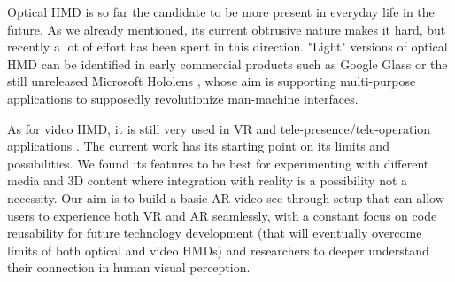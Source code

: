 Optical HMD is so far the candidate to be more present in everyday life in the future. As we already mentioned, its current obtrusive nature makes it hard, but recently a lot of effort has been spent in this direction. "Light" versions of optical HMD can be identified in early commercial products such as Google Glass \cite{google_glass} or the still unreleased Microsoft Hololens \cite{microsoft_hololens}, whose aim is supporting multi-purpose applications to supposedly revolutionize man-machine interfaces.

As for video HMD, it is still very used in VR and tele-presence/tele-operation applications \cite{telepresence_intro}. The current work has its starting point on its limits and possibilities. We found its features to be best for experimenting with different media and 3D content where integration with reality is a possibility not a necessity. Our aim is to build a basic AR video see-through setup that can allow users to experience both VR and AR seamlessly, with a constant focus on code reusability for future technology development (that will eventually overcome limits of both optical and video HMDs) and researchers to deeper understand their connection in human visual perception.


